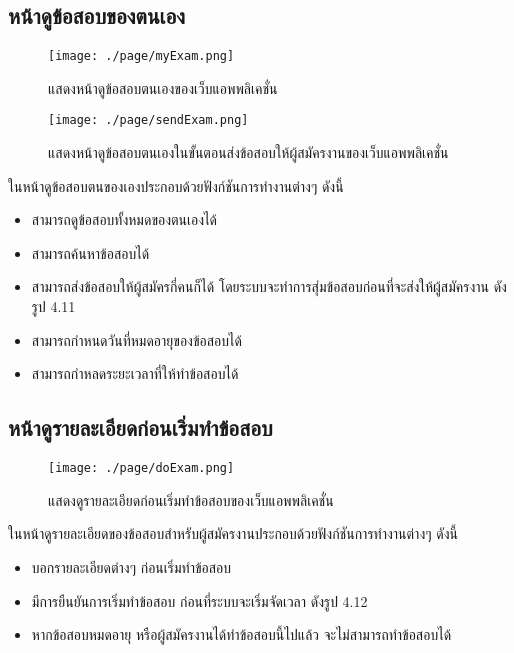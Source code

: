 \subsection{หน้าดูข้อสอบของตนเอง}
\begin{figure}[H]
  \centering
  \texttt{[image: ./page/myExam.png]}
  \caption{แสดงหน้าดูข้อสอบตนเองของเว็บแอพพลิเคชั่น}
  \label{Fig:myExam}
\end{figure}
\begin{figure}[H]
    \centering
    \texttt{[image: ./page/sendExam.png]}
    \caption{แสดงหน้าดูข้อสอบตนเองในขั้นตอนส่งข้อสอบให้ผู้สมัครงานของเว็บแอพพลิเคชั่น}
    \label{Fig:sendExam}
  \end{figure}
ในหน้าดูข้อสอบตนของเองประกอบด้วยฟังก์ชันการทำงานต่างๆ ดังนี้
\begin{itemize}
    \item สามารถดูข้อสอบทั้งหมดของตนเองได้
    \item สามารถค้นหาข้อสอบได้
    \item สามารถส่งข้อสอบให้ผู้สมัครกี่คนก็ได้ โดยระบบจะทำการสุ่มข้อสอบก่อนที่จะส่งให้ผู้สมัครงาน ดังรูป 4.11
    \item สามารถกำหนดวันที่หมดอายุของข้อสอบได้
    \item สามารถกำหลดระยะเวลาที่ให้ทำข้อสอบได้
\end{itemize}

\subsection{หน้าดูรายละเอียดก่อนเริ่มทำข้อสอบ}
\begin{figure}[H]
  \centering
  \texttt{[image: ./page/doExam.png]}
  \caption{แสดงดูรายละเอียดก่อนเริ่มทำข้อสอบของเว็บแอพพลิเคชั่น}
  \label{Fig:doExam}
\end{figure}
ในหน้าดูรายละเอียดของข้อสอบสำหรับผู้สมัครงานประกอบด้วยฟังก์ชันการทำงานต่างๆ ดังนี้
\begin{itemize}
  \item บอกรายละเอียดต่างๆ ก่อนเริ่มทำข้อสอบ
  \item มีการยืนยันการเริ่มทำข้อสอบ ก่อนที่ระบบจะเริ่มจัดเวลา ดังรูป 4.12
  \item หากข้อสอบหมดอายุ หรือผู้สมัครงานได้ทำข้อสอบนี้ไปแล้ว จะไม่สามารถทำข้อสอบได้
\end{itemize}

